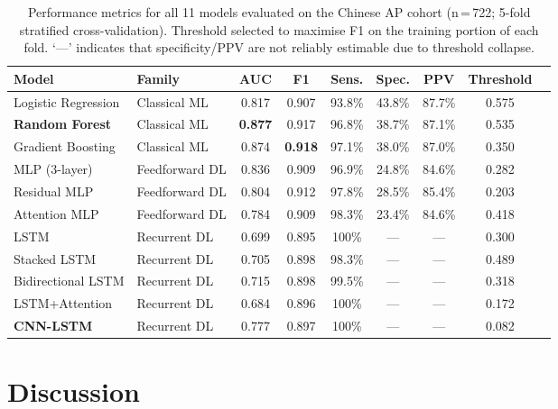 \documentclass[12pt,a4paper]{article}
\begin{document}
\begin{table}[H]
\centering
\caption{Performance metrics for all 11 models evaluated on the Chinese AP cohort (n\,=\,722; 5-fold stratified cross-validation). Threshold selected to maximise F1 on the training portion of each fold. `—' indicates that specificity/PPV are not reliably estimable due to threshold collapse.}
\label{tab:results}
\renewcommand{\arraystretch}{1.3}
\begin{tabular}{llccccccc}
\toprule
\textbf{Model} & \textbf{Family} & \textbf{AUC} & \textbf{F1} & \textbf{Sens.} & \textbf{Spec.} & \textbf{PPV} & \textbf{Threshold} \\
\midrule
Logistic Regression     & Classical ML     & 0.817 & 0.907 & 93.8\% & 43.8\% & 87.7\% & 0.575 \\
\textbf{Random Forest}  & Classical ML     & \textbf{0.877} & 0.917 & 96.8\% & 38.7\% & 87.1\% & 0.535 \\
Gradient Boosting       & Classical ML     & 0.874 & \textbf{0.918} & 97.1\% & 38.0\% & 87.0\% & 0.350 \\
\midrule
MLP (3-layer)           & Feedforward DL   & 0.836 & 0.909 & 96.9\% & 24.8\% & 84.6\% & 0.282 \\
Residual MLP            & Feedforward DL   & 0.804 & 0.912 & 97.8\% & 28.5\% & 85.4\% & 0.203 \\
Attention MLP           & Feedforward DL   & 0.784 & 0.909 & 98.3\% & 23.4\% & 84.6\% & 0.418 \\
\midrule
LSTM                    & Recurrent DL     & 0.699 & 0.895 & 100\%  & —      & —      & 0.300 \\
Stacked LSTM            & Recurrent DL     & 0.705 & 0.898 & 98.3\% & —      & —      & 0.489 \\
Bidirectional LSTM      & Recurrent DL     & 0.715 & 0.898 & 99.5\% & —      & —      & 0.318 \\
LSTM+Attention          & Recurrent DL     & 0.684 & 0.896 & 100\%  & —      & —      & 0.172 \\
\textbf{CNN-LSTM}       & Recurrent DL     & 0.777 & 0.897 & 100\%  & —      & —      & 0.082 \\
\bottomrule
\end{tabular}
\end{table}

\section{Discussion}
\end{document}
